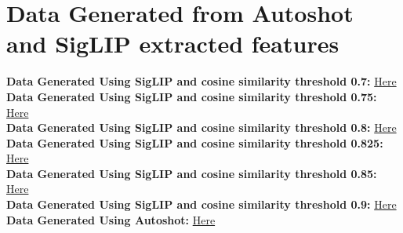 \documentclass[12pt]{report}
\begin{document}
	\chapter{Data Generated from Autoshot and SigLIP extracted features} \label{app:sbd_data_generated}
	\textbf{Data Generated Using  SigLIP and cosine similarity threshold 0.7:} \href{https://drive.google.com/file/d/1zpSfm0qOPEXGNEAlp2KM09MBGJoDtcKe/view?usp=drive_link}{Here}\\
	\textbf{Data Generated Using  SigLIP and cosine similarity threshold 0.75:} \href{https://drive.google.com/file/d/1O0mPg9bQileNMIyL-vi18cFkqNSzEtTi/view?usp=drive_link}{Here}\\
	\textbf{Data Generated Using  SigLIP and cosine similarity threshold 0.8:} \href{https://drive.google.com/file/d/1pk40mGxHREp5P0yrCRBrVPDl49blwSAw/view?usp=drive_link}{Here}\\
	\textbf{Data Generated Using  SigLIP and cosine similarity threshold 0.825:} \href{https://drive.google.com/file/d/1-i-5CtC-CVe6HbEdwzMqXfT4D9KlcmBv/view?usp=drive_link}{Here}\\
	\textbf{Data Generated Using  SigLIP and cosine similarity threshold 0.85:} \href{https://drive.google.com/file/d/1LL25kAKj1Eveez6Hz-188vYmNO_rDq2M/view?usp=drive_link}{Here}\\
	\textbf{Data Generated Using  SigLIP and cosine similarity threshold 0.9:} \href{https://drive.google.com/file/d/1iX0DxCosq3k7LzxOxn7fQyoSQO81F-19/view?usp=drive_link}{Here}\\
	\textbf{Data Generated Using Autoshot:} \href{https://drive.google.com/file/d/1Hmepj3dKsN4WH5u9O8TYn7xI31vU6-Qi/view?usp=drive_link}{Here}\\
\end{document}
